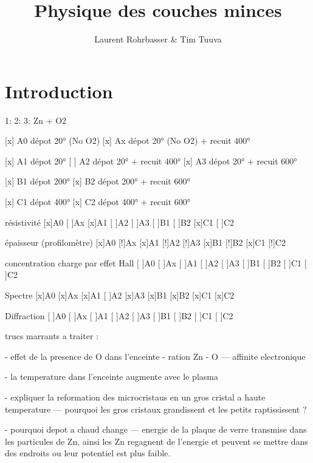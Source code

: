 \documentclass[a4paper,12pt,oneside]{article}
\begin{document}
\title{Physique des couches minces}
\author{Laurent Rohrbasser \& Tim Tuuva}

\maketitle
\tableofcontents
\baselineskip=16pt
\parindent=15pt
\parskip=5pt

\begin{abstract}
\end{abstract}

\section{Introduction}




1:
2:
3: Zn + O2






[x] A0 dépot 20° (No O2)
[x] Ax dépot 20° (No O2) + recuit 400°

[x] A1 dépot 20°
[ ] A2 dépot 20° + recuit 400°
[x] A3 dépot 20° + recuit 600°

[x] B1 dépot 200°
[x] B2 dépot 200° + recuit 600°

[x] C1 dépot 400°
[x] C2 dépot 400° + recuit 600°



résistivité
[x]A0
[ ]Ax
[x]A1
[ ]A2
[ ]A3
[ ]B1
[ ]B2
[x]C1
[ ]C2

épaisseur (profilomètre)
[x]A0
[!]Ax
[x]A1
[!]A2
[!]A3
[x]B1
[!]B2
[x]C1
[!]C2

concentration charge par effet Hall
[ ]A0
[ ]Ax
[ ]A1
[ ]A2
[ ]A3
[ ]B1
[ ]B2
[ ]C1
[ ]C2

Spectre
[x]A0
[x]Ax
[x]A1
[ ]A2
[x]A3
[x]B1
[x]B2
[x]C1
[x]C2

Diffraction 
[ ]A0
[ ]Ax
[ ]A1
[ ]A2
[ ]A3
[ ]B1
[ ]B2
[ ]C1
[ ]C2


trucs marrants a traiter :

- effet de la presence de O dans l'enceinte
- ration Zn - O 
--- affinite electronique


- la temperature dans l'enceinte augmente avec le plasma

- expliquer la reformation des microcristaus en un gros cristal a haute temperature
--- pourquoi les gros cristaux grandissent et les petits raptississent ?

- pourquoi depot a chaud change
--- energie de la plaque de verre transmise dans les particules de Zn, ainsi les Zn regagnent de l'energie et peuvent se mettre dans des endroits ou leur potentiel est plus faible.
\end{document}
